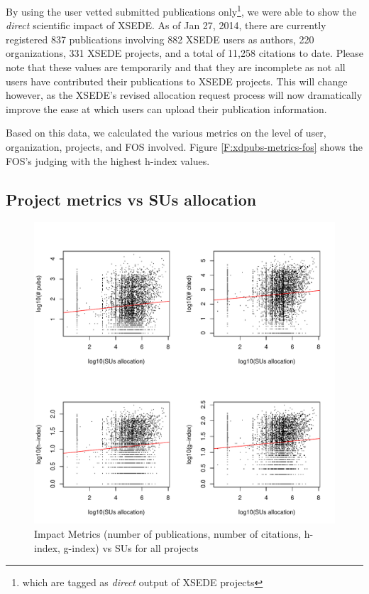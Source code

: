 \documentclass{sig-alternate}
\begin{document}
By using the user vetted submitted publications only\footnote{which are tagged as \emph{direct} output of XSEDE projects}, we were able to show the \emph{direct} scientific impact of XSEDE.  As of Jan 27, 2014, there are currently registered 837 publications involving 882 XSEDE users as authors, 220 organizations, 331 XSEDE projects, and a total of 11,258 citations to date. Please note that these values are temporarily and that they are incomplete as not all users have contributed their publications to XSEDE projects.   This will change however, as the XSEDE's revised allocation request process will now dramatically improve the ease at which users can upload their publication information.

Based on this data, we calculated the various metrics on the level of user, organization, projects, and FOS involved. Figure \ref{F:xdpubs-metrics-fos} shows the FOS's judging with the highest h-index values. 
 
\subsection{Project metrics vs SUs allocation} 
 
\begin{figure}[!htb] 
  \centering 
    \includegraphics[width=1.0\columnwidth]{images/02_metrics_vs_alloc_proj.pdf} 
  \caption{Impact Metrics (number of publications, number of citations, h-index, g-index) vs SUs for all projects}\label{F:metrics-vs-alloc-proj} 
\end{figure} 
 
\end{document}
